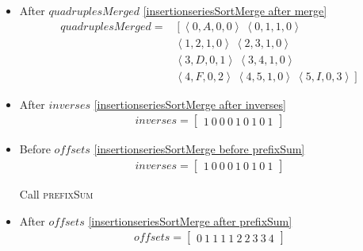\begin{frame}[containsverbatim]{\insertionseriesexampleframe}
\begin{columns}[c]
\begin{column}{0.7\textwidth}
{\begin{minipage}[c]{\textwidth}
\begin{multicols}{2}
\begin{itemize}
                                    \item After $quadruplesMerged$ \cref{insertionseriesSortMerge after merge}
                                    \begin{align*}
                                        quadruplesMerged = & \left[\left<0, A, 0, 0\right> \ \left<0, 1, 1, 0\right>\right. \\ 
                                        & \left.\left<1, 2, 1, 0\right> \ \left<2, 3, 1, 0\right>\right. \\
                                        & \left.\left<3, D, 0, 1\right> \ \left<3, 4, 1, 0\right>\right. \\
                                        & \left.\left<4, F, 0, 2\right> \ \left<4, 5, 1, 0\right> \ \left<5, I, 0, 3\right>\right]
                                    \end{align*}
                                    
                                    \item After $inverses$ \cref{insertionseriesSortMerge after inverses}
                                    \begin{align*}
                                        inverses = \begin{bmatrix}1 \ 0 \ 0 \ 0 \ 1 \ 0 \ 1 \ 0 \ 1\end{bmatrix}
                                    \end{align*}
                                    
                                    \item Before $offsets$ \cref{insertionseriesSortMerge before prefixSum}
                                    \begin{align*}
                                        inverses = \begin{bmatrix}1 \ 0 \ 0 \ 0 \ 1 \ 0 \ 1 \ 0 \ 1\end{bmatrix}
                                    \end{align*}
        
                                    Call \textsc{prefixSum}
                                    
                                    \item After $offsets$ \cref{insertionseriesSortMerge after prefixSum}
                                    \begin{align*}
                                        offsets = \begin{bmatrix}0 \ 1 \ 1 \ 1 \ 1 \ 2 \ 2 \ 3 \ 3 \ 4\end{bmatrix}
                                    \end{align*}
                                    

\end{itemize}
\end{multicols}
\end{minipage}}
\end{column}
\end{columns}
\end{frame}
